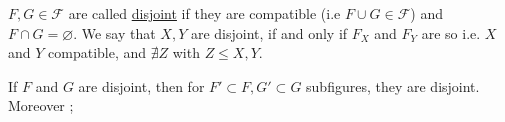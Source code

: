 
 $F,G\in\mathcal F$ are called \uline{disjoint} if they are compatible (i.e $F\cup G\in\mathcal F$) and $F\cap G=\varnothing$. We say that $X,Y$ are disjoint, if and only if $F_X$ and $F_Y$ are so i.e. $X$ and $Y$ compatible, and $\nexists Z$ with $Z\leq X,Y$.

If $F$ and $G$ are disjoint, then for $F'\subset F,G'\subset G$ subfigures, they are disjoint. Moreover ;
